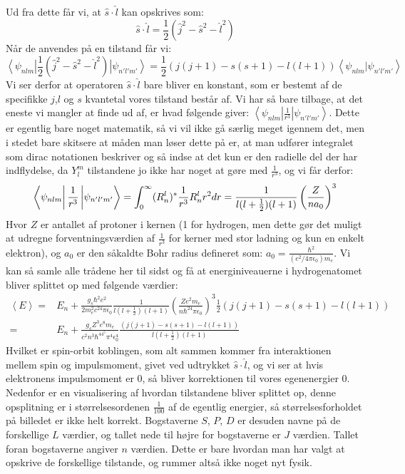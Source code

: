 \documentclass[../../Atom-ogMolekylefysik.tex]{subfiles}
\begin{document}
Ud fra dette får vi, at $\hat{s}\cdot\hat{l}$ kan opskrives som:
\begin{equation}
    \hat{s}\cdot\hat{l}=\frac{1}{2}\left(\hat{j}^2-\hat{s}^2-\hat{l}^2\right)
\end{equation}
Når de anvendes på en tilstand får vi:
\begin{equation}
    \left<\psi_{nlm}\right|\frac{1}{2}\left(\hat{j}^2-\hat{s}^2-\hat{l}^2\right)\left|\psi_{n'l'm'}\right>=\frac{1}{2}\left(j(j+1)-s(s+1)-l(l+1)\right)\left<\psi_{nlm}|\psi_{n'l'm'}\right>
\end{equation}
Vi ser derfor at operatoren $\hat{s}\cdot\hat{l}$ bare bliver en konstant, som er bestemt af de specifikke $j$,$l$ og $s$ kvantetal vores tilstand består af. Vi har så bare tilbage, at det eneste vi mangler at finde ud af, er hvad følgende giver: $\left<\psi_{nlm}\right|\frac{1}{r^3}\left|\psi_{n'l'm'}\right>$. Dette er egentlig bare noget matematik, så vi vil ikke gå særlig meget igennem det, men i stedet bare skitsere at måden man løser dette på er, at man udfører integralet som dirac notationen beskriver  og så indse at det kun er den radielle del der har indflydelse, da $Y_l^m$ tilstandene jo ikke har noget at gøre med $\frac{1}{r^3}$, og vi får derfor:
\begin{equation}
    \matrixel{\psi_{nlm}}{\frac{1}{r^3}}{\psi_{n'l'm'}}=\int_{0}^{\infty}(R_n^l)^{*}\frac{1}{r^3}R_n^lr^2dr=\frac{1}{l(l+\frac{1}{2})(l+1)}\left(\frac{Z}{na_0}\right)^3
\end{equation}
Hvor $Z$ er antallet af protoner i kernen (1 for hydrogen, men dette gør det muligt at udregne forventningsværdien af $\frac{1}{r^3}$ for kerner med stor ladning og kun en enkelt elektron), og $a_0$ er den såkaldte Bohr radius defineret som: $a_0=\frac{\hbar^2}{(e^2/4\pi\epsilon_0)m_e }$.
Vi kan så samle alle trådene her til sidst og få at energiniveauerne i hydrogenatomet bliver splittet op med følgende værdier:
\begin{align}
    \nonumber\left<E\right>=&E_{n}+\frac{g_s\hbar^2e^2}{2m_e^2c^24\pi\epsilon_0}\frac{1}{l(l+\frac{1}{2})(l+1)}\left(\frac{Ze^2m_e}{n\hbar^24\pi\epsilon_0}\right)^3\frac{1}{2}\left(j(j+1)-s(s+1)-l(l+1)\right)\\
    =&E_{n}+
    \frac{g_sZ^3e^8m_e}{c^2n^3\hbar^44^5\pi^4\epsilon_0^4}
    \frac{\left(j(j+1)-s(s+1)-l(l+1)\right)}{l(l+\frac{1}{2})(l+1)}
\end{align}
Hvilket er spin-orbit koblingen, som alt sammen kommer fra interaktionen mellem spin og impulsmoment, givet ved udtrykket $\hat{s}\cdot\hat{l}$, og vi ser at hvis elektronens impulsmoment er 0, så bliver korrektionen til vores egenenergier 0. Nedenfor er en visualisering af hvordan tilstandene bliver splittet op, denne opsplitning er i størrelsesordenen $\frac{1}{100}$ af de egentlig energier, så størrelsesforholdet på billedet er ikke helt korrekt. Bogstaverne $S$, $P$, $D$ er desuden navne på de forskellige $L$ værdier, og tallet nede til højre for bogstaverne er $J$ værdien. Tallet foran bogstaverne angiver $n$ værdien. Dette er bare hvordan man har valgt at opskrive de forskellige tilstande, og rummer altså ikke noget nyt fysik. 
\end{document}
